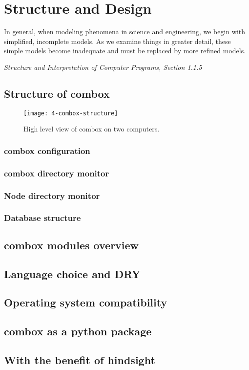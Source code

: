 \chapter{Structure and Design}

\epigraph{In general, when modeling phenomena in science and
  engineering, we begin with simplified, incomplete models. As we
  examine things in greater detail, these simple models become
  inadequate and must be replaced by more refined
  models.}{\textit{Structure and Interpretation of Computer Programs,
    Section 1.1.5}\cite{sicp}}

\section{Structure of combox}


\begin{figure}[h]
\texttt{[image: 4-combox-structure]}
\caption{High level view of combox on two computers.}
\label{fig:4-combox-structure}
\end{figure}

\subsection{combox configuration}

\subsection{combox directory monitor}

\subsection{Node directory monitor}

\subsection{Database structure}

\section{combox modules overview}

\section{Language choice and DRY}

\section{Operating system compatibility}

\section{combox as a python package}

\section{With the benefit of hindsight}